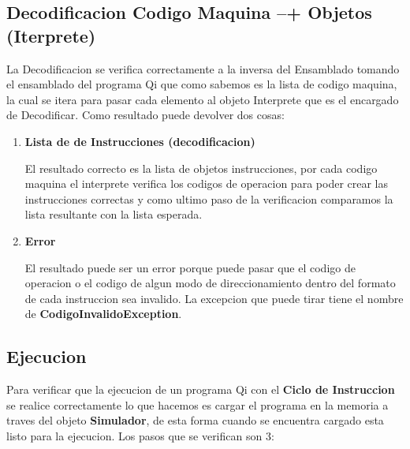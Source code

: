 \subsection{Decodificacion Codigo Maquina --+ Objetos (Iterprete)}
La Decodificacion se verifica correctamente a la inversa del Ensamblado tomando el ensamblado del programa Qi que como sabemos es la lista de codigo maquina, la cual se itera para pasar cada elemento al objeto Interprete que es el encargado de Decodificar. Como resultado puede devolver dos cosas: 
\begin{enumerate}
\item \textbf{Lista de de Instrucciones (decodificacion)} 

El resultado correcto es la lista de objetos instrucciones, por cada codigo maquina el interprete verifica los codigos de operacion para poder crear las instrucciones correctas y como ultimo paso de la verificacion comparamos la lista resultante con la lista esperada.
\item\textbf{Error}

El resultado puede ser un error porque puede pasar que el codigo de operacion o el codigo de algun modo de direccionamiento dentro del formato de cada instruccion sea invalido. La excepcion que puede tirar tiene el nombre de \textbf{CodigoInvalidoException}.   
\end{enumerate}


\subsection{Ejecucion}

Para verificar que la ejecucion de un programa Qi con el \textbf{Ciclo de Instruccion} se realice correctamente lo que hacemos es cargar el programa en la memoria a traves del objeto \textbf{Simulador}, de esta forma cuando se encuentra cargado esta listo para la ejecucion. Los pasos que se verifican son 3:

